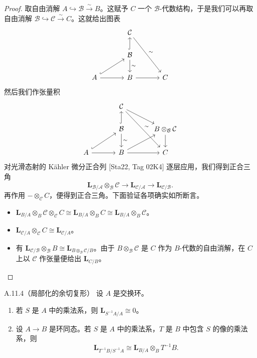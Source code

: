 \begin{proof}
取自由消解 $A\hookrightarrow\mathcal B\xrightarrow{\sim}B$。这赋予 $C$ 一个 $\mathcal B$-代数结构，于是我们可以再取自由消解 $\mathcal B\hookrightarrow\mathcal C\xrightarrow{\sim}C$。这就给出图表
\[
\begin{tikzcd}[column sep=3.4em, row sep=1.8em]
& \mathcal C \arrow[ddr, "{\sim}"] & \\
& \mathcal B \arrow[u, hook] \arrow[d, "{\sim}"] & \\
A \arrow[ur, hook] \arrow[r] & B \arrow[r] & C
\end{tikzcd}
\]
然后我们作张量积
\[
\begin{tikzcd}[column sep=3.4em, row sep=1.8em]
& \mathcal C \arrow[ddr, "{\sim}"] \arrow[dr] & \\
& \mathcal B \arrow[u, hook] \arrow[d, "{\sim}"] & B\otimes_{\mathcal B}\mathcal C \arrow[d] \\
A \arrow[ur, hook] \arrow[r] & B \arrow[r] \arrow[ur] & C
\end{tikzcd}
\]
对光滑态射的 Kähler 微分正合列 [Sta22, Tag 02K4] 逐层应用，我们得到正合三角
\[
\mathbf L_{\mathcal B/\mathcal A}\otimes_{\mathcal B}\mathcal C\to\mathbf L_{\mathcal C/\mathcal A}\to\mathbf L_{\mathcal C/\mathcal B}.
\]
再作用 $-\otimes_{\mathcal C}C$，便得到正合三角。下面验证各项确实如所断言。

\begin{itemize}
\item $\mathbf L_{B/A}\otimes_B\mathcal C\otimes_{\mathcal C}C\cong\mathbf L_{B/A}\otimes_B C\cong\mathbf L_{B/A}\otimes_B\mathcal C$。
\item $\mathbf L_{\mathcal C/A}\otimes_{\mathcal C}C\cong\mathbf L_{\mathcal C/A}$。
\item 有 $\mathbf L_{\mathcal C/\mathcal B}\otimes_{\mathcal B}B\cong\mathbf L_{B\otimes_{\mathcal B}\mathcal C/B}$。由于 $B\otimes_{\mathcal B}\mathcal C$ 是 $C$ 作为 $B$-代数的自由消解，在 $C$ 上以 $\mathcal C$ 作张量便给出 $\mathbf L_{C/B}$。
\end{itemize}
\end{proof}

\begin{cor}{A.11.4}（局部化的余切复形）\label{thm:a6-07-23}
设 $A$ 是交换环。
\begin{enumerate}[(1)]
\item 若 $S$ 是 $A$ 中的乘法系，则 $\mathbf L_{S^{-1}A/A}\cong0$。
\item 设 $A\to B$ 是环同态。若 $S$ 是 $A$ 中的乘法系，$T$ 是 $B$ 中包含 $S$ 的像的乘法系，则
\[
\mathbf L_{T^{-1}B/S^{-1}A}\cong\mathbf L_{B/A}\otimes_B T^{-1}B.
\]
\end{enumerate}
\end{cor}

